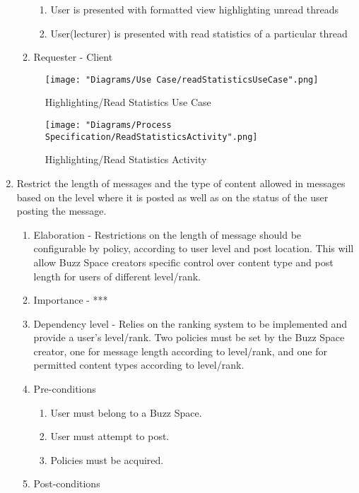 \documentclass[12pt]{article}
\begin{document}
\begin{enumerate}
\begin{enumerate}
    \begin{enumerate}
    	\item User is presented with formatted view highlighting unread threads
    	\item User(lecturer) is presented with read statistics of a particular thread
    \end{enumerate}
    \item Requester - Client
  \end{enumerate}
  \begin{figure}[h]
  		\centering
  		\texttt{[image: "Diagrams/Use Case/readStatisticsUseCase".png]}
  		\caption{Highlighting/Read Statistics Use Case}
  	\end{figure}
  	\begin{figure}[h]
  		\centering
  		\texttt{[image: "Diagrams/Process Specification/ReadStatisticsActivity".png]}
  		\caption{Highlighting/Read Statistics Activity}
  	\end{figure}
\clearpage %
  \item Restrict the length of messages and the type of content allowed in messages based
on the level where it is posted as well as on the status of the user posting the
message.  %
  \begin{enumerate}
    \item Elaboration - Restrictions on the length of message should be configurable by policy, according to user level and post location. This will allow Buzz Space creators specific control over content type and post length for users of different level/rank.
    \item Importance - ***
    \item Dependency level - Relies on the ranking system to be implemented and provide a user's level/rank. Two policies must be set by the Buzz Space creator, one for message length according to level/rank, and one for permitted content types according to level/rank.
    \item Pre-conditions
    \begin{enumerate}
    	\item User must belong to a Buzz Space.
    	\item User must attempt to post.
	\item Policies must be acquired.
    \end{enumerate}
        \item Post-conditions

\end{enumerate}
\end{enumerate}
\end{document}
